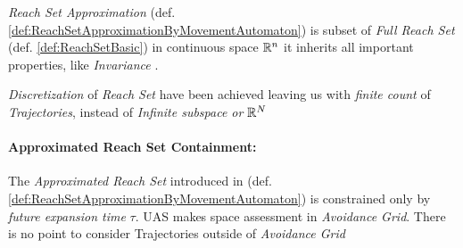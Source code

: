     \begin{note}
        \emph{Reach Set Approximation} (def. \ref{def:ReachSetApproximationByMovementAutomaton}) is subset of \emph{Full Reach Set} (def. \ref{def:ReachSetBasic}) in continuous space $\mathbb{R}^n$ it inherits all important properties, like \emph{Invariance} \cite{blanchini1999set}.
        
        \emph{Discretization} of \emph{Reach Set} have been achieved leaving us with \emph{finite count} of \emph{Trajectories}, instead of \emph{Infinite subspace or $\mathbb{R}^N$}
    \end{note}

    \paragraph{Approximated Reach Set Containment:} The \emph{Approximated Reach Set} introduced in (def. \ref{def:ReachSetApproximationByMovementAutomaton}) is constrained only by \emph{future expansion time} $\tau$. UAS makes space assessment in \emph{Avoidance Grid}. There is no point to consider Trajectories outside of \emph{Avoidance Grid}
    
